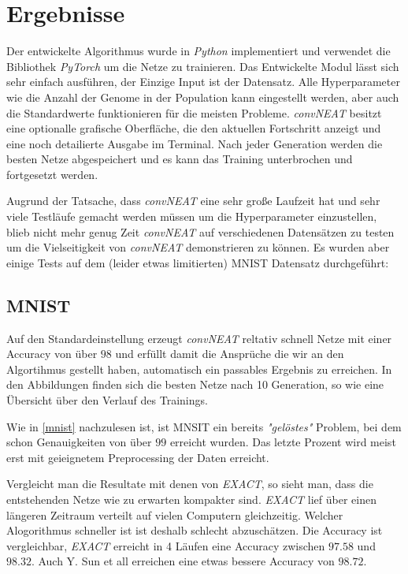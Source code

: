 \documentclass[]{scrartcl}
\begin{document}
	\section{Ergebnisse}\label{ergeb}
		
		Der entwickelte Algorithmus wurde in \textit{Python} implementiert und verwendet die Bibliothek \textit{PyTorch} um die Netze zu trainieren.
		Das Entwickelte Modul lässt sich sehr einfach ausführen, der Einzige Input ist der Datensatz. 
		Alle Hyperparameter wie die Anzahl der Genome in der Population kann eingestellt werden, aber auch die Standardwerte funktionieren für die meisten Probleme.
		\textit{convNEAT} besitzt eine optionalle grafische Oberfläche, die den aktuellen Fortschritt anzeigt und eine noch detailierte Ausgabe im Terminal.
		Nach jeder Generation werden die besten Netze abgespeichert und es kann das Training unterbrochen und fortgesetzt werden.

		Augrund der Tatsache, dass \textit{convNEAT} eine sehr große Laufzeit hat und sehr viele Testläufe gemacht werden müssen um die Hyperparameter einzustellen, blieb nicht mehr genug Zeit
		\textit{convNEAT} auf verschiedenen Datensätzen zu testen um die Vielseitigkeit von \textit{convNEAT} demonstrieren zu können.
		Es wurden aber einige Tests auf dem (leider etwas limitierten) MNIST Datensatz durchgeführt:

		\subsection{MNIST}
			
			Auf den Standardeinstellung erzeugt \textit{convNEAT} reltativ schnell Netze mit einer Accuracy von über $98$ und erfüllt damit die Ansprüche die wir an
			den Algortihmus gestellt haben, automatisch ein passables Ergebnis zu erreichen.
			In den Abbildungen finden sich die besten Netze nach 10 Generation, so wie eine Übersicht über den Verlauf des Trainings.


			Wie in \ref{mnist} nachzulesen ist, ist MNSIT ein bereits \textit{"gelöstes"} Problem, bei dem schon Genauigkeiten von über $99$ erreicht wurden.
			Das letzte Prozent wird meist erst mit geieignetem Preprocessing der Daten erreicht.

			Vergleicht man die Resultate mit denen von \textit{EXACT}, so sieht man, dass die entstehenden Netze wie zu erwarten kompakter sind.
			\textit{EXACT} lief über einen längeren Zeitraum verteilt auf vielen Computern gleichzeitig.
			Welcher Alogorithmus schneller ist ist deshalb schlecht abzuschätzen.
			Die Accuracy ist vergleichbar, \textit{EXACT} erreicht in 4 Läufen eine Accuracy zwischen $97.58$ und $98.32$.
			Auch Y. Sun et all erreichen eine etwas bessere Accuracy von $98.72$.
\end{document}
